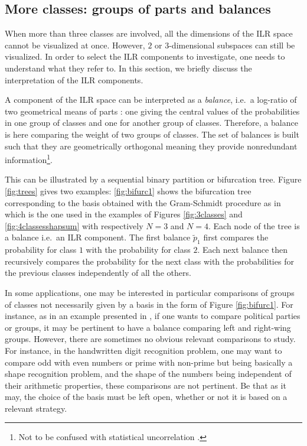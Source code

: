 \documentclass{article}
\theoremstyle{plain}
\theoremstyle{definition}
\theoremstyle{remark}
\begin{document}
\subsection{More classes: groups of parts and balances}
\label{sec:balances}

When more than three classes are involved, all the dimensions of the ILR space cannot be visualized at once. However, $2$ or $3$-dimensional subspaces can still be visualized. In order to select the ILR components to investigate, one needs to understand what they refer to. In this section, we briefly discuss the interpretation of the ILR components.%

A component of the ILR space can be interpreted as a \emph{balance}, i.e.~a log-ratio of two geometrical means of parts \cite{egozcue2003isometric,egozcue2005groups,pawlowskymodeling}: one giving the central values of the probabilities in one group of classes and one for another group of classes. Therefore, a balance is here comparing the weight of two groups of classes. The set of balances is built such that they are geometrically orthogonal meaning they provide nonredundant information\footnote{Not to be confused with statistical uncorrelation \cite{pawlowskymodeling}.}.

This can be illustrated by a sequential binary partition or bifurcation tree. Figure \ref{fig:trees} gives two examples: \ref{fig:bifurc1} shows the bifurcation tree corresponding to the basis obtained with the Gram-Schmidt procedure as in \cite{egozcue2003isometric} which is the one used in the examples of Figures \ref{fig:3classes} and \ref{fig:4classesshapsum}  with respectively $N=3$ and $N=4$. Each node of the tree is a balance i.e.~an ILR component. The first balance $\tilde{p}_1$ first compares the probability for class $1$ with the probability for class $2$. Each next balance then recursively compares the probability for the next class with the probabilities for the previous classes independently of all the others.

In some applications, one may be interested in particular comparisons of groups of classes not necessarily given by a basis in the form of Figure \ref{fig:bifurc1}. For instance, as in an example presented in \cite{egozcue2005groups}, if one wants to compare political parties or groups, it may be pertinent to have a balance comparing left and right-wing groups. However, there are sometimes no obvious relevant comparisons to study. For instance, in the handwritten digit recognition problem, one may want to compare odd with even numbers or prime with non-prime but being basically a shape recognition problem, and the shape of the numbers being independent of their arithmetic properties, these comparisons are not pertinent. Be that as it may, the choice of the basis must be left open, whether or not it is based on a relevant strategy.
\end{document}
